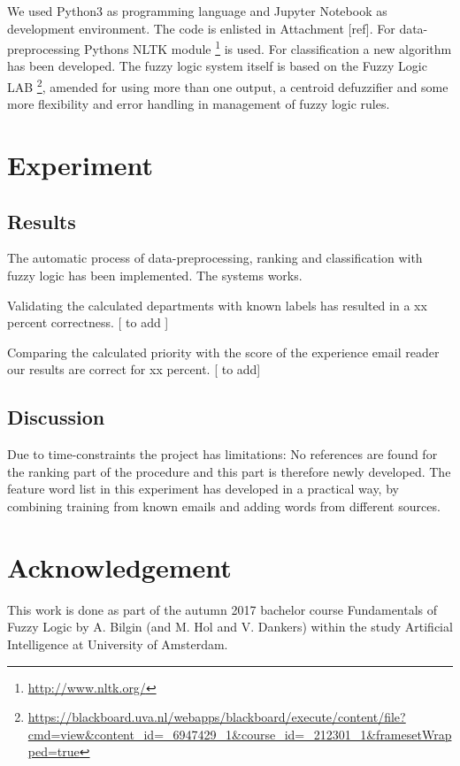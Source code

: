 \documentclass[journal]{IEEEtran}
\begin{document}
We used Python3 as programming language and Jupyter Notebook as development 
environment. The code is enlisted in Attachment [ref]. For data-preprocessing Pythons NLTK module \footnote{\url{http://www.nltk.org/}} is used. For classification a new algorithm has been developed. The fuzzy logic system itself is based on the Fuzzy Logic LAB \footnote{\url{https://blackboard.uva.nl/webapps/blackboard/execute/content/file?cmd=view&content_id=_6947429_1&course_id=_212301_1&framesetWrapped=true}}, amended for using more than one output, a centroid defuzzifier and some more flexibility and error handling in management of fuzzy logic rules. 

\section{Experiment}

\subsection{Results}

The automatic process of data-preprocessing, ranking and classification with fuzzy logic has been implemented. The systems works. 

Validating the calculated departments with known labels has resulted in a xx percent correctness. [ to add ]

Comparing the calculated priority with the score of the experience email reader our results are correct for xx percent. [ to add]

\subsection{Discussion}

Due to time-constraints the project has limitations: No references are found for the ranking part of the procedure and this part is therefore newly developed. The feature word list in this experiment has developed in a practical way, by combining training from known emails and adding words from different sources.

\section{Acknowledgement}

This work is done as part of the autumn 2017 bachelor course Fundamentals of Fuzzy Logic by A. Bilgin (and  M. Hol and V. Dankers) within the study Artificial Intelligence at University of Amsterdam.
\end{document}
